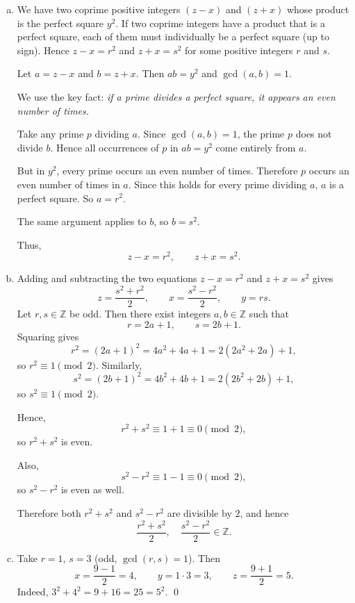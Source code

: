 \documentclass[12pt]{article}
\begin{document}
\begin{enumerate}[(a)]
  \item We have two coprime positive integers $(z-x)$ and $(z+x)$ whose
        product is the perfect square $y^2$.  If two coprime integers have a
        product that is a perfect square, each of them must individually be a
        perfect square (up to sign).  Hence $z - x = r^2$ and $z + x = s^2$
        for some positive integers $r$ and $s$.

      Let \(a = z-x\) and \(b = z+x\). Then \(ab = y^2\) and \(\gcd(a,b)=1\).

      We use the key fact:
      \emph{if a prime divides a perfect square, it appears an even number of times.}

      Take any prime \(p\) dividing \(a\). Since \(\gcd(a,b)=1\), the prime \(p\) does not divide \(b\). Hence all occurrences of \(p\) in \(ab=y^2\) come entirely from \(a\).

      But in \(y^2\), every prime occurs an even number of times. Therefore \(p\) occurs an even number of times in \(a\). Since this holds for every prime dividing \(a\), \(a\) is a perfect square. So \(a=r^2\).

      The same argument applies to \(b\), so \(b=s^2\).

      Thus,
      \[
      z-x=r^2,\qquad z+x=s^2.
      \]

  \item Adding and subtracting the two equations $z - x = r^2$ and
        $z + x = s^2$ gives
        \[
          z = \frac{s^2 + r^2}{2}, \qquad
          x = \frac{s^2 - r^2}{2}, \qquad
          y = rs.
        \]
      Let \( r,s \in \mathbb{Z} \) be odd. Then there exist integers \( a,b \in \mathbb{Z} \) such that
      \[
      r = 2a+1, \qquad s = 2b+1.
      \]
      Squaring gives
      \[
      r^2 = (2a+1)^2 = 4a^2 + 4a + 1 = 2(2a^2 + 2a) + 1,
      \]
      so \( r^2 \equiv 1 \pmod{2} \). Similarly,
      \[
      s^2 = (2b+1)^2 = 4b^2 + 4b + 1 = 2(2b^2 + 2b) + 1,
      \]
      so \( s^2 \equiv 1 \pmod{2} \).

      Hence,
      \[
      r^2 + s^2 \equiv 1 + 1 \equiv 0 \pmod{2},
      \]
      so \( r^2 + s^2 \) is even.

      Also,
      \[
      s^2 - r^2 \equiv 1 - 1 \equiv 0 \pmod{2},
      \]
      so \( s^2 - r^2 \) is even as well.

      Therefore both \( r^2 + s^2 \) and \( s^2 - r^2 \) are divisible by \(2\), and hence
      \[
      \frac{r^2 + s^2}{2}, \quad \frac{s^2 - r^2}{2} \in \mathbb{Z}.
      \]

  \item Take $r = 1$, $s = 3$ (odd, $\gcd(r,s)=1$).  Then
        \[
          x = \frac{9-1}{2} = 4, \qquad
          y = 1 \cdot 3 = 3, \qquad
          z = \frac{9+1}{2} = 5.
        \]
        Indeed, $3^2 + 4^2 = 9 + 16 = 25 = 5^2$. \qed

\end{enumerate}
\end{document}
